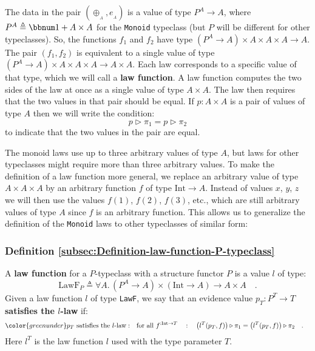 The data in the pair $(\oplus_{_{A}},e_{_{A}})$ is a value of type
$P^{A}\rightarrow A$, where $P^{A}\triangleq\bbnum 1+A\times A$
for the \lstinline!Monoid!
typeclass (but $P$ will be different for other typeclasses). So,
the functions $f_{1}$ and $f_{2}$ have type $(P^{A}\rightarrow A)\times A\times A\times A\rightarrow A$.
The pair $(f_{1},f_{2})$ is equivalent to a single value of type
$(P^{A}\rightarrow A)\times A\times A\times A\rightarrow A\times A$.
Each law corresponds to a specific value of that type, which we will
call a \textbf{law function}. A law function
computes the two sides of the law at once as a single value of type
$A\times A$. The law then requires that the two values in that pair
should be equal. If $p:A\times A$ is a pair of values of type $A$
then we will write the condition: 
\[
p\triangleright\pi_{1}=p\triangleright\pi_{2}
\]
to indicate that the two values in the pair are equal.

The monoid laws use up to three arbitrary values of type $A$, but
laws for other typeclasses might require more than three arbitrary
values. To make the definition of a law function more general, we
replace an arbitrary value of type $A\times A\times A$ by an arbitrary
function $f$ of type $\text{Int}\rightarrow A$. Instead of values
$x$, $y$, $z$ we will then use the values $f(1)$, $f(2)$, $f(3)$,
etc., which are still arbitrary values of type $A$ since $f$ is
an arbitrary function. This allows us to generalize the definition
of the \lstinline!Monoid!
laws to other typeclasses of similar form:

\subsubsection{Definition \label{subsec:Definition-law-function-P-typeclass}\ref{subsec:Definition-law-function-P-typeclass}}

A \textbf{law function} for a $P$-typeclass 
with a structure functor $P$
is a value $l$ of type: 
\begin{equation}
\text{LawF}_{P}\triangleq\forall A.\,(P^{A}\rightarrow A)\times(\text{Int}\rightarrow A)\rightarrow A\times A\quad.\label{eq:P-typeclass-law-type}
\end{equation}
Given a law function $l$ of type \lstinline!LawF!,
we say that an evidence value $p_{T}:P^{T}\rightarrow T$ \textbf{satisfies
the $l$-law} if:
\begin{align}
{\color{greenunder}p_{T}\text{ satisfies the }l\text{-law}:}\quad & \text{for all }f^{:\text{Int}\rightarrow T}\quad:\quad\big(l^{T}(p_{T},f)\big)\triangleright\pi_{1}=\big(l^{T}(p_{T},f)\big)\triangleright\pi_{2}\quad.\label{eq:P-typeclass-law}
\end{align}
Here $l^{T}$ is the law function $l$ used with the type parameter
$T$.


